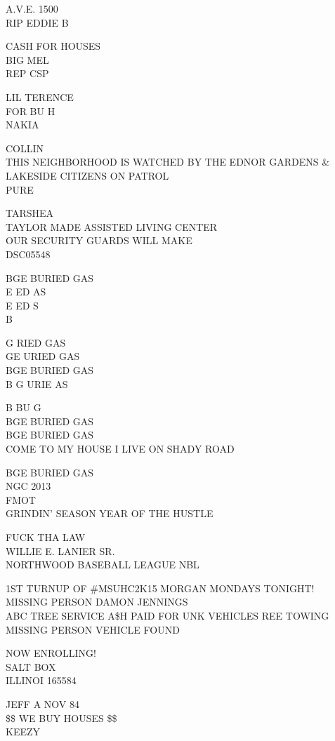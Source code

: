 \documentclass[10pt,letterpaper]{article}
\begin{document}
A.V.E. 1500\\
RIP EDDIE B

CASH FOR HOUSES\\
BIG MEL\\
REP CSP

LIL TERENCE\\
FOR BU H\\
NAKIA

COLLIN\\
THIS NEIGHBORHOOD IS WATCHED BY THE EDNOR GARDENS \& LAKESIDE CITIZENS ON PATROL\\
PURE

TARSHEA\\
TAYLOR MADE ASSISTED LIVING CENTER\\
OUR SECURITY GUARDS WILL MAKE\\
DSC05548

BGE BURIED GAS\\
E ED AS\\
E ED S\\
B

G RIED GAS\\
GE URIED GAS\\
BGE BURIED GAS\\
B G URIE AS

B BU G\\
BGE BURIED GAS\\
BGE BURIED GAS\\
COME TO MY HOUSE I LIVE ON SHADY ROAD

BGE BURIED GAS\\
NGC 2013\\
FMOT\\
GRINDIN' SEASON YEAR OF THE HUSTLE

FUCK THA LAW\\
WILLIE E. LANIER SR.\\
NORTHWOOD BASEBALL LEAGUE NBL

1ST TURNUP OF \#MSUHC2K15 MORGAN MONDAYS TONIGHT!\\
MISSING PERSON DAMON JENNINGS\\
ABC TREE SERVICE A\$H PAID FOR UNK VEHICLES REE TOWING\\
MISSING PERSON VEHICLE FOUND

NOW ENROLLING!\\
SALT BOX\\
ILLINOI 165584

JEFF A NOV 84\\
\$\$ WE BUY HOUSES \$\$\\
KEEZY
\end{document}
